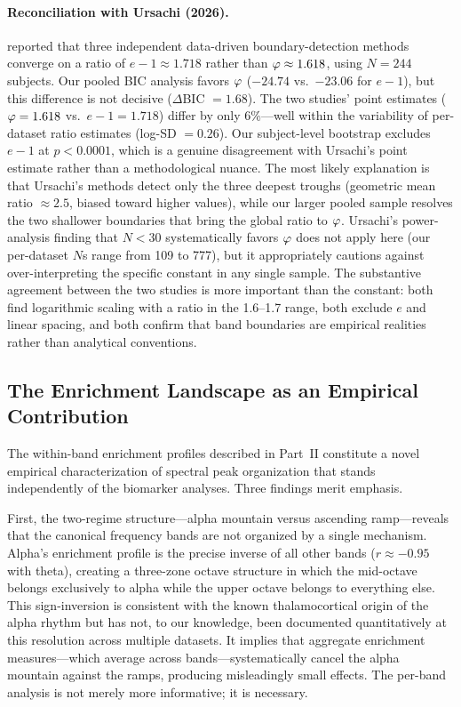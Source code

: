 \paragraph{Reconciliation with Ursachi (2026).}
\textcite{ursachi2026boundaries} reported that three independent data-driven boundary-detection methods converge on a ratio of $e - 1 \approx 1.718$ rather than $\varphi \approx 1.618$, using $N = 244$ subjects. Our pooled BIC analysis favors $\varphi$ ($-24.74$ vs.\ $-23.06$ for $e - 1$), but this difference is not decisive ($\Delta$BIC $= 1.68$). The two studies' point estimates ($\varphi = 1.618$ vs.\ $e - 1 = 1.718$) differ by only 6\%---well within the variability of per-dataset ratio estimates (log-SD $= 0.26$). Our subject-level bootstrap excludes $e - 1$ at $p < 0.0001$, which is a genuine disagreement with Ursachi's point estimate rather than a methodological nuance. The most likely explanation is that Ursachi's methods detect only the three deepest troughs (geometric mean ratio $\approx 2.5$, biased toward higher values), while our larger pooled sample resolves the two shallower boundaries that bring the global ratio to $\varphi$. Ursachi's power-analysis finding that $N < 30$ systematically favors $\varphi$ does not apply here (our per-dataset $N$s range from 109 to 777), but it appropriately cautions against over-interpreting the specific constant in any single sample. The substantive agreement between the two studies is more important than the constant: both find logarithmic scaling with a ratio in the 1.6--1.7 range, both exclude $e$ and linear spacing, and both confirm that band boundaries are empirical realities rather than analytical conventions.

\subsection{The Enrichment Landscape as an Empirical Contribution}

The within-band enrichment profiles described in Part~II constitute a novel empirical characterization of spectral peak organization that stands independently of the biomarker analyses. Three findings merit emphasis.

First, the two-regime structure---alpha mountain versus ascending ramp---reveals that the canonical frequency bands are not organized by a single mechanism. Alpha's enrichment profile is the precise inverse of all other bands ($r \approx -0.95$ with theta), creating a three-zone octave structure in which the mid-octave belongs exclusively to alpha while the upper octave belongs to everything else. This sign-inversion is consistent with the known thalamocortical origin of the alpha rhythm but has not, to our knowledge, been documented quantitatively at this resolution across multiple datasets. It implies that aggregate enrichment measures---which average across bands---systematically cancel the alpha mountain against the ramps, producing misleadingly small effects. The per-band analysis is not merely more informative; it is necessary.

